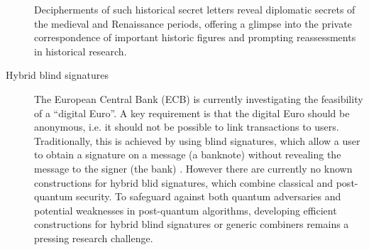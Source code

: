 \documentclass{article}
\begin{document}
\begin{description}
 Decipherments of such historical secret letters
 reveal diplomatic secrets of the medieval and Renaissance periods, offering a glimpse into the private correspondence of important historic figures and prompting reassessments in historical research.
    \item[Hybrid blind signatures] The European Central Bank (ECB) is currently investigating the feasibility of a ``digital Euro''. A key requirement is that the digital Euro should be anonymous, i.e. it should not be possible to link transactions to users. Traditionally, this is achieved by using blind signatures, which allow a user to obtain a signature on a message (a banknote) without revealing the message to the signer (the bank) \cite{Chaum82}. However there are currently no known constructions for hybrid blid signatures, which combine classical and post-quantum security. To safeguard against both quantum adversaries and potential weaknesses in post-quantum algorithms, developing efficient constructions for hybrid blind signatures or generic combiners remains a pressing research challenge.

\end{description}


\end{document}
